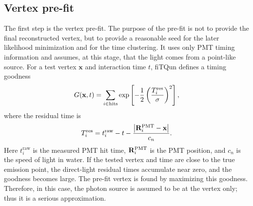 \documentclass{article}
\numberwithin{table}{subsection}
\numberwithin{figure}{subsection}
\numberwithin{equation}{subsection}
\numberwithin{footnote}{subsection}
\begin{document}
\subsection{Vertex pre-fit}
The first step is the vertex pre-fit. The purpose of the pre-fit is not to
provide the final reconstructed vertex, but to provide a reasonable seed for
the later likelihood minimization and for the time clustering. It uses only
PMT timing information and assumes, at this stage, that the light comes from
a point-like source. For a test vertex \(\mathbf{x}\) and interaction time \(t\),
fiTQun defines a timing goodness
\[
  G(\mathbf{x},t)
  =
  \sum_{i \in {\rm hits}}
  \exp\left[
    -\frac{1}{2}
    \left(
      \frac{T_i^{\rm res}}{\sigma}
    \right)^2
  \right],
\]
where the residual time is
\[
  T_i^{\rm res}
  =
  t_i^\mathrm{raw}
  -
  t
  -
  \frac{
    \left|
      \mathbf{R}_i^{\rm PMT} - \mathbf{x}
    \right|
  }{c_n}.
\]
Here \(t_i^\mathrm{raw}\) is the measured PMT hit time,
\(\mathbf{R}_i^{\rm PMT}\) is the PMT position, and \(c_n\) is the speed of
light in water. If the tested vertex and time are close to the true emission
point, the direct-light residual times accumulate near zero, and the goodness
becomes large. The pre-fit vertex is found by maximizing this goodness. Therefore, in this case, the  photon source is assumed to be at the vertex only; thus it is a serious approximation.
\end{document}
